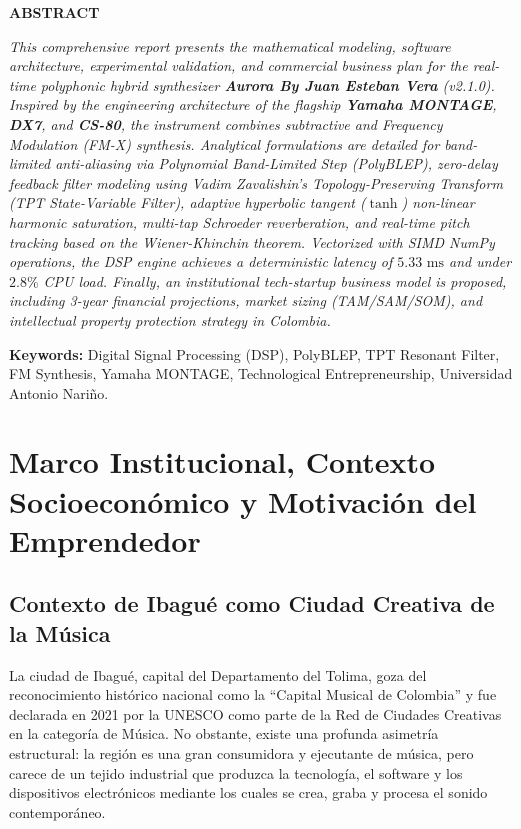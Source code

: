\documentclass[11pt,a4paper]{article}
\begin{document}
\begin{center}
    {\large \bfseries ABSTRACT}
\end{center}

\noindent \textit{This comprehensive report presents the mathematical modeling, software architecture, experimental validation, and commercial business plan for the real-time polyphonic hybrid synthesizer \textbf{Aurora By Juan Esteban Vera} (v2.1.0). Inspired by the engineering architecture of the flagship \textbf{Yamaha MONTAGE}, \textbf{DX7}, and \textbf{CS-80}, the instrument combines subtractive and Frequency Modulation (FM-X) synthesis. Analytical formulations are detailed for band-limited anti-aliasing via Polynomial Band-Limited Step (PolyBLEP), zero-delay feedback filter modeling using Vadim Zavalishin's Topology-Preserving Transform (TPT State-Variable Filter), adaptive hyperbolic tangent ($\tanh$) non-linear harmonic saturation, multi-tap Schroeder reverberation, and real-time pitch tracking based on the Wiener-Khinchin theorem. Vectorized with SIMD NumPy operations, the DSP engine achieves a deterministic latency of $5.33\text{ ms}$ and under $2.8\%$ CPU load. Finally, an institutional tech-startup business model is proposed, including 3-year financial projections, market sizing (TAM/SAM/SOM), and intellectual property protection strategy in Colombia.}

\vspace{0.4cm}
\noindent \textbf{Keywords:} Digital Signal Processing (DSP), PolyBLEP, TPT Resonant Filter, FM Synthesis, Yamaha MONTAGE, Technological Entrepreneurship, Universidad Antonio Nariño.

\newpage
\tableofcontents
\newpage

\section{Marco Institucional, Contexto Socioeconómico y Motivación del Emprendedor}

\subsection{Contexto de Ibagué como Ciudad Creativa de la Música}
La ciudad de Ibagué, capital del Departamento del Tolima, goza del reconocimiento histórico nacional como la ``Capital Musical de Colombia'' y fue declarada en 2021 por la UNESCO como parte de la Red de Ciudades Creativas en la categoría de Música. No obstante, existe una profunda asimetría estructural: la región es una gran consumidora y ejecutante de música, pero carece de un tejido industrial que produzca la tecnología, el software y los dispositivos electrónicos mediante los cuales se crea, graba y procesa el sonido contemporáneo.
\end{document}
